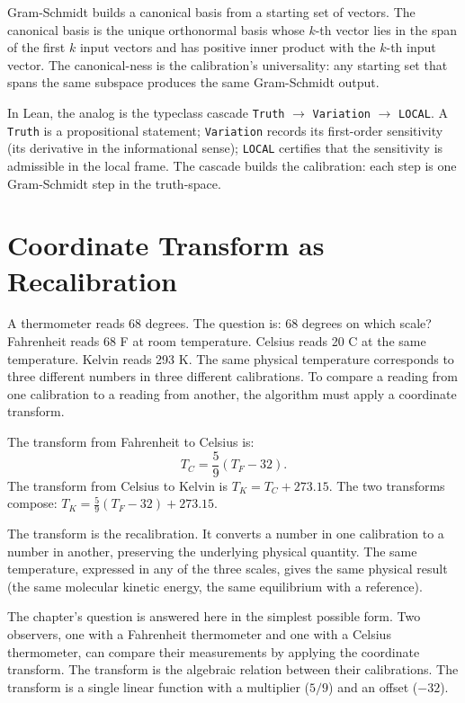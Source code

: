 Gram-Schmidt builds a canonical basis from a starting set of
vectors. The canonical basis is the unique orthonormal basis whose
$k$-th vector lies in the span of the first $k$ input vectors and
has positive inner product with the $k$-th input vector. The
canonical-ness is the calibration's universality: any starting set
that spans the same subspace produces the same Gram-Schmidt
output.

In Lean, the analog is the typeclass cascade
\texttt{Truth} $\to$ \texttt{Variation} $\to$ \texttt{LOCAL}. A
\texttt{Truth} is a propositional statement; \texttt{Variation}
records its first-order sensitivity (its derivative in the
informational sense); \texttt{LOCAL} certifies that the
sensitivity is admissible in the local frame. The cascade builds
the calibration: each step is one Gram-Schmidt step in the
truth-space.

\section{Coordinate Transform as Recalibration}
\label{se:coordinate-transform-as-recalibration}

A thermometer reads 68 degrees. The question is: 68 degrees on
which scale? Fahrenheit reads 68 F at room temperature. Celsius
reads 20 C at the same temperature. Kelvin reads 293 K. The same
physical temperature corresponds to three different numbers in three
different calibrations. To compare a reading from one calibration
to a reading from another, the algorithm must apply a coordinate
transform.

The transform from Fahrenheit to Celsius is:
\[
T_C = \frac{5}{9}(T_F - 32).
\]
The transform from Celsius to Kelvin is $T_K = T_C + 273.15$. The
two transforms compose: $T_K = \frac{5}{9}(T_F - 32) + 273.15$.

The transform is the recalibration. It converts a number in one
calibration to a number in another, preserving the underlying
physical quantity. The same temperature, expressed in any of the
three scales, gives the same physical result (the same molecular
kinetic energy, the same equilibrium with a reference).

The chapter's question is answered here in the simplest possible
form. Two observers, one with a Fahrenheit thermometer and one
with a Celsius thermometer, can compare their measurements by
applying the coordinate transform. The transform is the algebraic
relation between their calibrations. The transform is a single
linear function with a multiplier ($5/9$) and an offset ($-32$).

